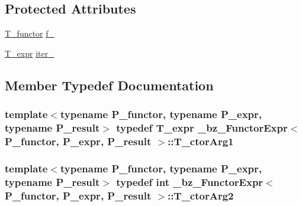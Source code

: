 \subsection*{Protected Attributes}
\begin{DoxyCompactItemize}
\item 
\hyperlink{class__bz__FunctorExpr_a6c0ecd2aeb9dea27ad1a9b9cbc6dd869}{T\+\_\+functor} \hyperlink{class__bz__FunctorExpr_acd19ef8e3e98802641e16a8a397c1d46}{f\+\_\+}
\item 
\hyperlink{class__bz__FunctorExpr_ae52bb9b2640fb1ad5efde18b4369fdea}{T\+\_\+expr} \hyperlink{class__bz__FunctorExpr_a25e14fe29b6a3a91a37d9e15b448e9cb}{iter\+\_\+}
\end{DoxyCompactItemize}


\subsection{Member Typedef Documentation}
\hypertarget{class__bz__FunctorExpr_acd1cb687c3a6280182608eed3c52e0f4}{}
\subsubsection[{T\+\_\+ctor\+Arg1}]{\setlength{\rightskip}{0pt plus 5cm}template$<$typename P\+\_\+functor, typename P\+\_\+expr, typename P\+\_\+result$>$ typedef {\bf T\+\_\+expr} {\bf \+\_\+bz\+\_\+\+Functor\+Expr}$<$ P\+\_\+functor, P\+\_\+expr, P\+\_\+result $>$\+::{\bf T\+\_\+ctor\+Arg1}}\label{class__bz__FunctorExpr_acd1cb687c3a6280182608eed3c52e0f4}
\hypertarget{class__bz__FunctorExpr_ab3fdd6127df9831e764b6d89ced76a86}{}
\subsubsection[{T\+\_\+ctor\+Arg2}]{\setlength{\rightskip}{0pt plus 5cm}template$<$typename P\+\_\+functor, typename P\+\_\+expr, typename P\+\_\+result$>$ typedef int {\bf \+\_\+bz\+\_\+\+Functor\+Expr}$<$ P\+\_\+functor, P\+\_\+expr, P\+\_\+result $>$\+::{\bf T\+\_\+ctor\+Arg2}}\label{class__bz__FunctorExpr_ab3fdd6127df9831e764b6d89ced76a86}
\hypertarget{class__bz__FunctorExpr_acdea39191b95dc668cc2658c38d6e1a7}{}
